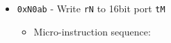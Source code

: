 \documentclass{article}
\def\incrementpk{\Verb|0502| - increment \Verb|pk|}
\def\regtodata#1{\Verb|#1003| - output \Verb|r#1| to data bus}
\def\regtoaddr#1{\Verb|#1103| - output \Verb|r#1| to addr bus}
\def\writewideport{\Verb|00a4| - write data line to 16bit port \Verb|addr|}
\def\done{\Verb|fffe| - end instruction}
\begin{document}
\begin{itemize}
    \item \Verb|0xN0ab| - Write \Verb|rN| to 16bit port \Verb|tM|
    \begin{itemize}
        \item Micro-instruction sequence:
    \end{itemize}
    
    \iffalse
    \item \Verb|| - 
    \begin{itemize}
        \item Micro-instruction sequence:
        \begin{itemize}
            \item \done
        \end{itemize}
    \end{itemize}
    \fi
\end{itemize}
\end{document}
